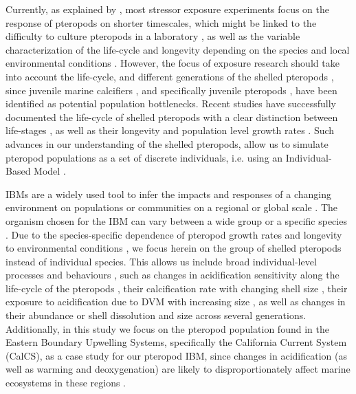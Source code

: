 Currently, as explained by \citet{Manno2017ReviewPteropodVulnerability}, most stressor exposure experiments focus on the response of pteropods on shorter timescales, which might be linked to the difficulty to culture pteropods in a laboratory \citep{Howes2014Lab}, as well as the variable characterization of the life-cycle and longevity depending on the species and local environmental conditions \citep{Bednarsek2012PteropodDistribution,Manno2017ReviewPteropodVulnerability}. However, the focus of exposure research should take into account the life-cycle, and different generations of the shelled pteropods \citep{Manno2017ReviewPteropodVulnerability}, since juvenile marine calcifiers \citep{Kroeker2013JuvenilesCalcifiers}, and specifically juvenile pteropods \citep{Bednarsek2016CumulativeEffects}, have been identified as potential population bottlenecks. Recent studies have successfully documented the life-cycle of shelled pteropods with a clear distinction between life-stages \citep{Howes2014Lab,Thabet2015Lifestages}, as well as their longevity and population level growth rates \citep{Wang2017Lifecycle}. Such advances in our understanding of the shelled pteropods, allow us to simulate pteropod populations as a set of discrete individuals, i.e. using an Individual-Based Model \citep[IBM; ][]{DeAngelis2014IBM}. 


IBMs are a widely used tool to infer the impacts and responses of a changing environment on populations or communities on a regional or global scale \citep{DeAngelis2014IBM}. The organism chosen for the IBM can vary between a wide group \citep[e.g. phytoplankton; ][]{Clark2011IBMAdaptations} or a specific species \citep[e.g. Calanus finmarchicus, three-spined stickleback][]{Miller1998CalanusIBM,Mintram2018IBM_Stickleback}. Due to the species-specific dependence of pteropod growth rates and longevity to environmental conditions  \citep[e.g. temperature, food availability; ][]{Wang2017Lifecycle}, we focus herein on the group of shelled pteropods instead of individual species. This allows us include broad individual-level processes and behaviours \citep{DeAngelis2014IBM}, such as changes in acidification sensitivity along the life-cycle of the pteropods \citep{Bednarsek2016CumulativeEffects}, their calcification rate with changing shell size \citep{Bednarsek2014CalcificationDissolution}, their exposure to acidification due to DVM with increasing size \citep{Maas2012DVM,Bednarsek2015VerticalDistribution}, as well as changes in their abundance or shell dissolution and size across several generations. Additionally, in this study we focus on the pteropod population found in the Eastern Boundary Upwelling Systems, specifically the California Current System (CalCS), as a case study for our pteropod IBM, since changes in acidification (as well as warming and deoxygenation) are likely to disproportionately affect marine ecosystems in these regions \citep{Gruber2011TripleWhammy,?}. 





